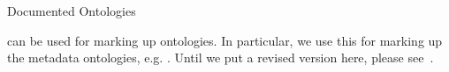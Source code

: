 
\begin{omgroup}[id=ontology,creators={miko,clange}]{Documented Ontologies}

  {\omdoc} can be used for marking up ontologies. In particular, we use this for marking
  up the metadata ontologies, e.g. {}. Until we put a revised
  version here, please see~\cite{LK:MathOntoAuthDoc09}.
\end{omgroup}

